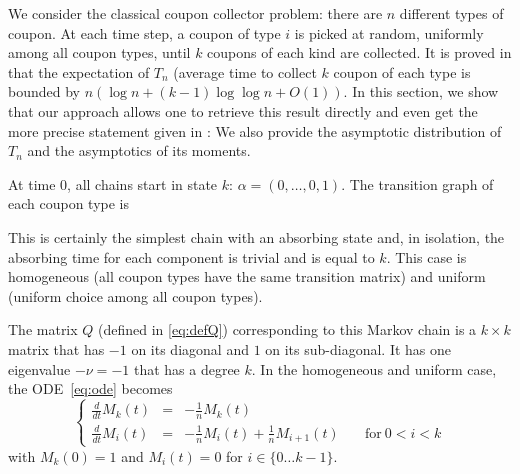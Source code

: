 \documentclass{aptpub}
\begin{document}
We consider the classical coupon collector problem: there are $n$
different types of coupon.  At each time step, a coupon of type $i$ is
picked at random, uniformly among all coupon types, until $k$ coupons
of each kind are collected.  It is proved in \cite{double-dixie} that
the expectation of $T_n$ (average time to collect $k$ coupon of each
type is bounded by $n(\log n + (k-1)\log\log n +O(1))$. In this
section, we show that our approach allows one to retrieve this result
directly and even get the more precise statement given in
\cite{Erdos}: We also provide the asymptotic distribution of $T_n$ and
the asymptotics of its moments.

At time $0$, all chains start in state $k$:
$\alpha=(0,\dots,0,1)$. The transition graph of each coupon type is
\begin{center}
\end{center}
This is certainly the simplest chain with an absorbing state and, in
isolation, the absorbing time for each component is trivial and is
equal to $k$.  This case is homogeneous (all coupon types have the
same transition matrix) and uniform (uniform choice among all coupon
types).

The matrix $Q$ (defined in \eqref{eq:defQ}) corresponding to this
Markov chain is a $k\times k$ matrix that has $-1$ on its diagonal and
$1$ on its sub-diagonal. It has one eigenvalue $-\nu=-1$ that has a
degree $k$.  In the homogeneous and uniform case, the
ODE~\eqref{eq:ode} becomes
\begin{equation*}
  \left\{
    \begin{array}{lcll}
      \displaystyle\frac{d}{dt}M_k(t)%
      &=& \displaystyle-\frac1nM_{k}(t) &\\[1em]
      \displaystyle\frac{d}{dt}M_i(t)%
      &=& \displaystyle-\frac1nM_{i}(t)+\frac1nM_{i+1}(t) & \quad \mathrm{for}~0<i<k
  \end{array}
  \right.
\end{equation*}
with $M_k(0)=1$ and $M_i(t)=0$ for $i\in\{0\dots k-1\}$.
\end{document}
